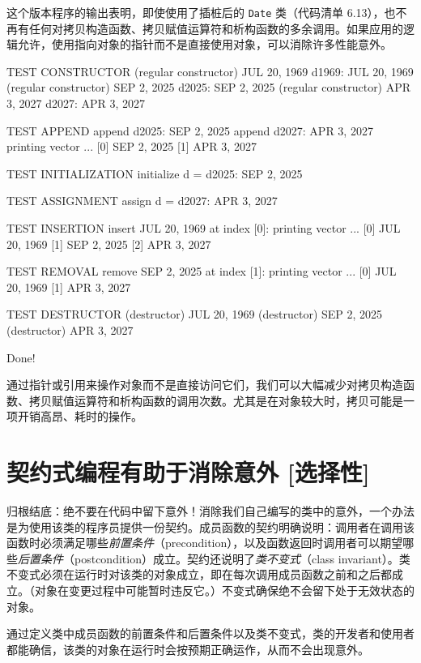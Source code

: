 这个版本程序的输出表明，即使使用了插桩后的 \texttt{Date} 类（代码清单 6.13），也不再有任何对拷贝构造函数、拷贝赋值运算符和析构函数的多余调用。如果应用的逻辑允许，使用指向对象的指针而不是直接使用对象，可以消除许多性能意外。

\begin{codebox}
TEST CONSTRUCTOR
(regular constructor) JUL 20, 1969
d1969: JUL 20, 1969
(regular constructor) SEP 2, 2025
d2025: SEP 2, 2025
(regular constructor) APR 3, 2027
d2027: APR 3, 2027

TEST APPEND
append d2025: SEP 2, 2025
append d2027: APR 3, 2027
printing vector ...
[0] SEP 2, 2025
[1] APR 3, 2027

TEST INITIALIZATION
initialize d = d2025:
SEP 2, 2025

TEST ASSIGNMENT
assign d = d2027:
APR 3, 2027

TEST INSERTION
insert JUL 20, 1969 at index [0]:
printing vector ...
[0] JUL 20, 1969
[1] SEP 2, 2025
[2] APR 3, 2027

TEST REMOVAL
remove SEP 2, 2025 at index [1]:
printing vector ...
[0] JUL 20, 1969
[1] APR 3, 2027

TEST DESTRUCTOR
(destructor) JUL 20, 1969
(destructor) SEP 2, 2025
(destructor) APR 3, 2027

Done!
\end{codebox}


通过指针或引用来操作对象而不是直接访问它们，我们可以大幅减少对拷贝构造函数、拷贝赋值运算符和析构函数的调用次数。尤其是在对象较大时，拷贝可能是一项开销高昂、耗时的操作。

\section{契约式编程有助于消除意外 [选择性]}

归根结底：绝不要在代码中留下意外！消除我们自己编写的类中的意外，一个办法是为使用该类的程序员提供一份契约。成员函数的契约明确说明：调用者在调用该函数时必须满足哪些\emph{前置条件}（precondition），以及函数返回时调用者可以期望哪些\emph{后置条件}（postcondition）成立。契约还说明了\emph{类不变式}（class invariant）。类不变式必须在运行时对该类的对象成立，即在每次调用成员函数之前和之后都成立。（对象在变更过程中可能暂时违反它。）不变式确保绝不会留下处于无效状态的对象。

通过定义类中成员函数的前置条件和后置条件以及类不变式，类的开发者和使用者都能确信，该类的对象在运行时会按预期正确运作，从而不会出现意外。

